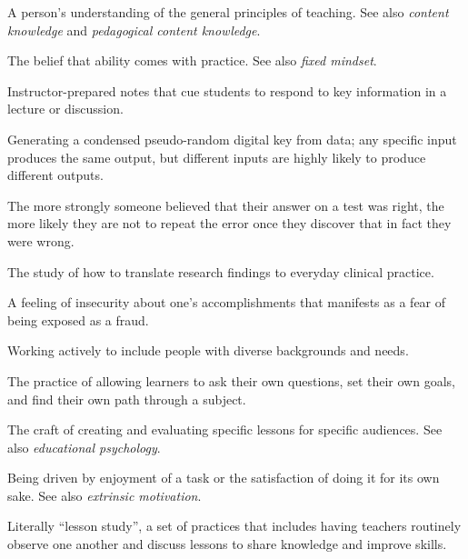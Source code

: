 \begin{description}

 A person's understanding of the general principles of
teaching. See also \emph{content knowledge} and \emph{pedagogical
content knowledge}.

 The belief that ability
comes with practice. See also \emph{fixed mindset}.

 Instructor-prepared notes that
cue students to respond to key information in a lecture or discussion.


 Generating a condensed pseudo-random
digital key from data; any specific input produces the same output,
but different inputs are highly likely to produce different outputs.

 The more strongly
someone believed that their answer on a test was right, the more
likely they are not to repeat the error once they discover that in
fact they were wrong.


The study of how to translate research findings to everyday clinical
practice.

 A feeling of
insecurity about one's accomplishments that manifests as a fear of
being exposed as a fraud.

 Working actively to include
people with diverse backgrounds and needs.

 The
practice of allowing learners to ask their own questions, set their
own goals, and find their own path through a subject.

 The craft of
creating and evaluating specific lessons for specific audiences. See
also \emph{educational psychology}.

 Being driven
by enjoyment of a task or the satisfaction of doing it for its own
sake.  See also \emph{extrinsic motivation}.


Literally ``lesson study'', a set of practices that includes having
teachers routinely observe one another and discuss lessons to share
knowledge and improve skills.


\end{description}
